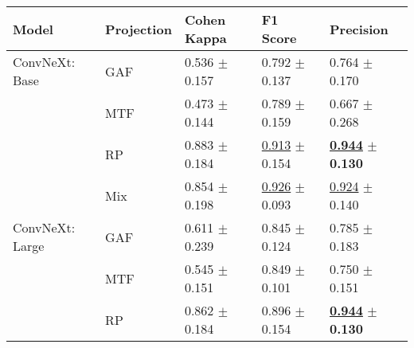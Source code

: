 
\begin{tabular}{lllll}
\toprule
Model & Projection & Cohen Kappa & F1 Score & Precision \\
\midrule
ConvNeXt: Base & GAF & \textcolor[rgb]{0.8501939719,0.1498060281,0}{0.536} $\pm$ \textcolor[rgb]{0.4498340830,0.5000000000,0}{0.157} & \textcolor[rgb]{0.9819518717,0.0180481283,0}{0.792} $\pm$ \textcolor[rgb]{0.6916472560,0.3083527440,0}{0.137} & \textcolor[rgb]{0.6500000000,0.3500000000,0}{0.764} $\pm$ \textcolor[rgb]{0.2890812278,0.5000000000,0}{0.170} \\
 & MTF & \textcolor[rgb]{1.0000000000,0.0000000000,0}{0.473} $\pm$ \textcolor[rgb]{0.3758318907,0.5000000000,0}{0.144} & \textcolor[rgb]{1.0000000000,0.0000000000,0}{0.789} $\pm$ \textcolor[rgb]{1.0000000000,0.0000000000,0}{0.159} & \textcolor[rgb]{1.0000000000,0.0000000000,0}{0.667} $\pm$ \textcolor[rgb]{1.0000000000,0.0000000000,0}{0.268} \\
 & RP & \textcolor[rgb]{0.0295434199,0.5000000000,0}{0.883} $\pm$ \textcolor[rgb]{0.5955244630,0.4044755370,0}{0.184} & \underline{\textcolor[rgb]{0.2319518717,0.5000000000,0}{0.913}} $\pm$ \textcolor[rgb]{0.9235235198,0.0764764802,0}{0.154} & \underline{\textbf{\textcolor[rgb]{0.0000000000,0.5000000000,0}{0.944}}} $\pm$ \textbf{\textcolor[rgb]{0.0000000000,0.5000000000,0}{0.130}} \\
 & Mix & \textcolor[rgb]{0.0984780662,0.5000000000,0}{0.854} $\pm$ \textcolor[rgb]{0.6747481909,0.3252518091,0}{0.198} & \underline{\textcolor[rgb]{0.1510695187,0.5000000000,0}{0.926}} $\pm$ \textcolor[rgb]{0.0999682822,0.5000000000,0}{0.093} & \underline{\textcolor[rgb]{0.0750000000,0.5000000000,0}{0.924}} $\pm$ \textcolor[rgb]{0.0718829596,0.5000000000,0}{0.140} \\
ConvNeXt: Large & GAF & \textcolor[rgb]{0.6729334527,0.3270665473,0}{0.611} $\pm$ \textcolor[rgb]{0.8999515496,0.1000484504,0}{0.239} & \textcolor[rgb]{0.6510695187,0.3489304813,0}{0.845} $\pm$ \textcolor[rgb]{0.5159088943,0.4840911057,0}{0.124} & \textcolor[rgb]{0.5750000000,0.4250000000,0}{0.785} $\pm$ \textcolor[rgb]{0.3827984820,0.5000000000,0}{0.183} \\
 & MTF & \textcolor[rgb]{0.8281110116,0.1718889884,0}{0.545} $\pm$ \textcolor[rgb]{0.4139672114,0.5000000000,0}{0.151} & \textcolor[rgb]{0.6265597148,0.3734402852,0}{0.849} $\pm$ \textcolor[rgb]{0.2093230731,0.5000000000,0}{0.101} & \textcolor[rgb]{0.7000000000,0.3000000000,0}{0.750} $\pm$ \textcolor[rgb]{0.1516428390,0.5000000000,0}{0.151} \\
 & RP & \textcolor[rgb]{0.0787824530,0.5000000000,0}{0.862} $\pm$ \textcolor[rgb]{0.5941088240,0.4058911760,0}{0.184} & \textcolor[rgb]{0.3348930481,0.5000000000,0}{0.896} $\pm$ \textcolor[rgb]{0.9311751943,0.0688248057,0}{0.154} & \underline{\textbf{\textcolor[rgb]{0.0000000000,0.5000000000,0}{0.944}}} $\pm$ \textbf{\textcolor[rgb]{0.0000000000,0.5000000000,0}{0.130}} \\

\end{tabular}
